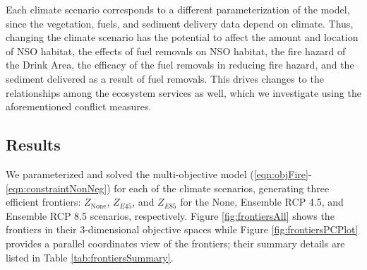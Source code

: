 Each climate scenario corresponds to a different parameterization of the model, since the vegetation, fuels, and sediment delivery data depend on climate. Thus, changing the climate scenario has the potential to affect the amount and location of NSO habitat, the effects of fuel removals on NSO habitat, the fire hazard of the Drink Area, the efficacy of the fuel removals in reducing fire hazard, and the sediment delivered as a result of fuel removals. This drives changes to the relationships among the ecosystem services as well, which we investigate using the aforementioned conflict measures.


\subsection{Results}
We parameterized and solved the multi-objective model (\eqref{eqn:objFire}-\eqref{eqn:constraintNonNeg}) for each of the climate scenarios, generating three efficient frontiers: $Z_{\text{None}}$, $Z_{E45}$, and $Z_{E85}$ for the None, Ensemble RCP 4.5, and Ensemble RCP 8.5 scenarios, respectively. Figure \ref{fig:frontiersAll} shows the frontiers in their 3-dimensional objective spaces while Figure \ref{fig:frontiersPCPlot} provides a parallel coordinates view of the frontiers; their summary details are listed in Table \ref{tab:frontiersSummary}.

